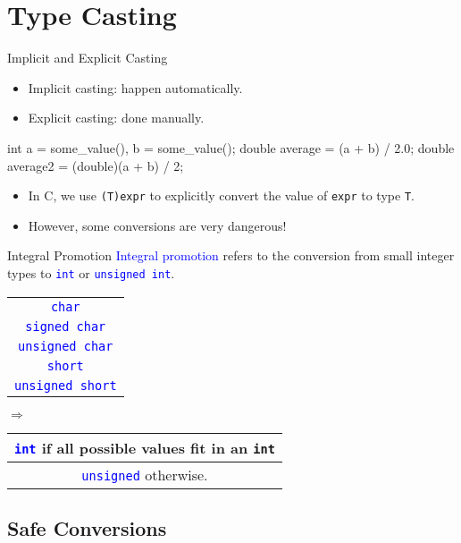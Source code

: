 \documentclass{beamer}
\newcommand{\blue}[1]{\textcolor{blue}{#1}}
\newcommand{\ttt}[1]{\texttt{#1}}
\newcommand{\bluett}[1]{\blue{\ttt{#1}}}
\theoremstyle{definition}
\begin{document}
\section{Type Casting}

\begin{frame}[fragile]{Implicit and Explicit Casting}
    \begin{itemize}
        \item Implicit casting: happen automatically.
        \item Explicit casting: done manually.
    \end{itemize}
    \pause
    \begin{cpp}
int a = some_value(), b = some_value();
double average = (a + b) / 2.0;
double average2 = (double)(a + b) / 2;
    \end{cpp}
    \pause
    \begin{itemize}
        \item In C, we use \ttt{(T)expr} to explicitly convert the value of \ttt{expr} to type \ttt{T}.
        \item However, some conversions are very dangerous!
    \end{itemize}
\end{frame}

\begin{frame}{Integral Promotion}
    \blue{Integral promotion} refers to the conversion from small integer types to \bluett{int} or \bluett{unsigned int}.
    \begin{tabular}{|c|}
        \hline
        \bluett{char}\\
        \bluett{signed char}\\
        \bluett{unsigned char}\\
        \bluett{short}\\
        \bluett{unsigned short}\\
        \hline
    \end{tabular}\(\Rightarrow\)\begin{tabular}{|c|}
        \hline
        \bluett{int} if all possible values fit in an \ttt{int}\\
        \hline
        \bluett{unsigned} otherwise.\\
        \hline
    \end{tabular}
\end{frame}

\subsection{Safe Conversions}
\end{document}
